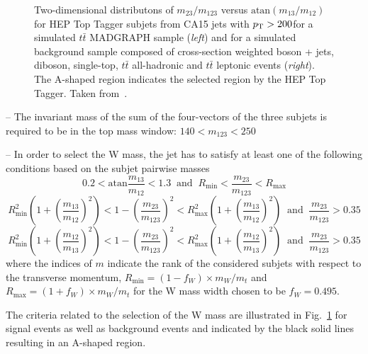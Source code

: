 \begin{description}
\begin{figure}[!tp]
\begin{tabular}{cc}
  \end{tabular}
  \caption{Two-dimensional distributons of $m_{\mathrm{23}}/m_{\mathrm{123}}$ versus $\mathrm{atan}(m_{\mathrm{13}}/m_{\mathrm{12}})$ for HEP Top Tagger subjets from CA15 jets with $p_{\text{T}} > 200$\gev for a simulated $t\bar{t}$ MADGRAPH sample (\textit{left}) and for a simulated background sample composed of cross-section weighted boson + jets, diboson, single-top, $t\bar{t}$ all-hadronic and $t\bar{t}$ leptonic events (\textit{right}). The A-shaped region indicates the selected region by the HEP Top Tagger. Taken from~\cite{CMS:2014fya}.}
  \label{fig:boosted_top_hep_variables}
\end{figure}
\begin{description}
 \item -- The invariant mass of the sum of the four-vectors of the three subjets is required to be in the top mass window: $140 < m_{\mathrm{123}} < 250$\gev
 \item -- In order to select the W mass, the jet has to satisfy at least one of the following conditions based on the subjet pairwise masses
 \begin{equation}
0.2 < \mathrm{atan} \frac{m_{\mathrm{13}}}{m_{\mathrm{12}}} < 1.3 \; \; \mathrm{and} \; \; R_{\mathrm{min}} < \frac{m_{\mathrm{23}}}{m_{\mathrm{123}}} < R_{\mathrm{max}} 
\label{eq:hep_1}
 \end{equation}
 \begin{equation}
 R^2_{\mathrm{min}} \left( 1+ \left(\frac{m_{\mathrm{13}}}{m_{\mathrm{12}}}\right)^2 \right)  < 1 - \left( \frac{m_{\mathrm{23}}}{m_{\mathrm{123}}} \right)^2  < R^2_{\mathrm{max}} \left( 1+\left(\frac{m_{\mathrm{13}}}{m_{\mathrm{12}}} \right)^2 \right) \; \; \mathrm{and} \; \; \frac{m_{\mathrm{23}}}{m_{\mathrm{123}}} > 0.35 
\label{eq:hep_2}
\end{equation}
\begin{equation}
 R^2_{\mathrm{min}} \left( 1+ \left(\frac{m_{\mathrm{12}}}{m_{\mathrm{13}}} \right)^2 \right)  < 1 - \left(\frac{m_{\mathrm{23}}}{m_{\mathrm{123}}}\right)^2 < R^2_{\mathrm{max}}\left(1+ \left(\frac{m_{\mathrm{12}}}{m_{\mathrm{13}}} \right)^2 \right) \; \; \mathrm{and} \; \; \frac{m_{\mathrm{23}}}{m_{\mathrm{123}}} > 0.35 
\label{eq:hep_3}
\end{equation}
where the indices of $m$ indicate the rank of the considered subjets with respect to the transverse momentum, $R_{\mathrm{min}} = (1 - f_{W}) \times m_W/m_t$ and $R_{\mathrm{max}} = (1 + f_{W}) \times m_W/m_t$ for the W mass width chosen to be $f_W = 0.495$.  
\end{description}
The criteria related to the selection of the W mass are illustrated in Fig.~\ref{fig:boosted_top_hep_variables} for signal events as well as background events and indicated by the black solid lines resulting in an A-shaped region.
\end{description}
